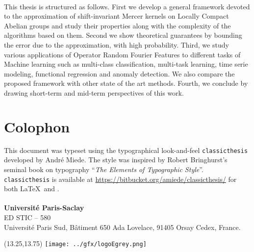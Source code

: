 \begin{addmargin}[-.5cm]{-2.5cm}
{{\begin{multicols}{2}
\paragraph{}
This thesis is structured as follows. First we develop a general framework devoted to the approximation of shift-invariant Mercer kernels on Locally Compact Abelian groups and study their properties along with the complexity of the algorithms based on them. Second we show theoretical guarantees by bounding the error due to the approximation, with high probability. Third, we study various applications of Operator Random Fourier Features to different tasks of Machine learning such as multi-class classification, multi-task learning, time serie modeling, functional regression and anomaly detection. We also compare the proposed framework with other state of the art methods. Fourth, we conclude by drawing short-term and mid-term perspectives of this work.
\end{multicols}\vspace*{-.5cm}}}

\vspace*{-2mm}
\normalcolor
\section*{Colophon}
\vspace*{-2mm}
\noindent This document was typeset using the typographical look-and-feel \texttt{cla\-ssic\-the\-sis} developed by Andr\'e Miede. The style was inspired by Robert Bringhurst's seminal book on typography ``\emph{The Elements of Typographic Style}''. \texttt{cla\-ssic\-the\-sis} is available at \url{https://bitbucket.org/amiede/classicthesis/} for both \LaTeX\ and \mLyX.
\paragraph{}
\vspace*{-2mm}
\noindent \color{PSaclay}\textbf{Universit\'e Paris-Saclay} \\
ED STIC -- 580 \\
Universit\'e Paris Sud, B\^atiment 650 Ada Lovelace, 91405 Orsay Cedex, France.

\begin{textblock}{13}(13.25,13.75)
\texttt{[image: ../gfx/logoEgrey.png]}
\end{textblock}

\end{addmargin}

